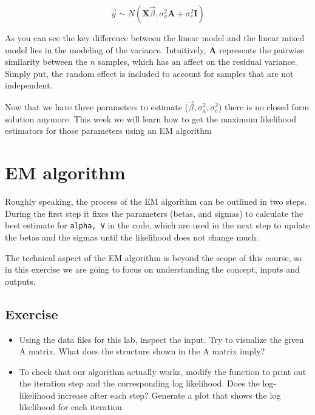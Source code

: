 \documentclass[11pt, oneside]{article}\usepackage[]{graphicx}\usepackage[]{color}
\begin{document}
$$ \vec{y} \sim N(\mathbf{X}\vec{\beta}, \sigma_a^2\mathbf{A} + \sigma_e^2\mathbf{I}) $$

As you can see the key difference between the linear model and the linear mixed model lies in the modeling of the variance. Intuitively, $ \mathbf{A} $ represents the pairwise similarity between the $ n $ samples, which has an affect on the residual variance. Simply put, the random effect is included to account for samples that are not independent.

Now that we have three parameters to estimate ($\vec{\beta}, \sigma_a^2, \sigma_e^2$) there is no closed form solution anymore. This week we will learn how to get the maximum likelihood estimators for those parameters using an EM algorithm

\section{EM algorithm}

Roughly speaking, the process of the EM algorithm can be outlined in two steps. During the first step it fixes the parameters (betas, and sigmas) to calculate the best estimate for \verb|alpha, V| in the code, which are used in the next step to update the betas and the sigmas until the likelihood does not change much.

The technical aspect of the EM algorithm is beyond the scope of this course, so in this exercise we are going to focus on understanding the concept, inputs and outputs.

\subsection{Exercise}

\begin{itemize}

  \item Using the data files for this lab, inspect the input. Try to visualize the given A matrix. What does the structure shown in the A matrix imply?


  \item To check that our algorithm actually works, modify the function to print out the iteration step and the corresponding log likelihood. Does the log-likelihood increase after each step? Generate a plot that shows the log likelihood for each iteration.

\end{itemize}
\end{document}

